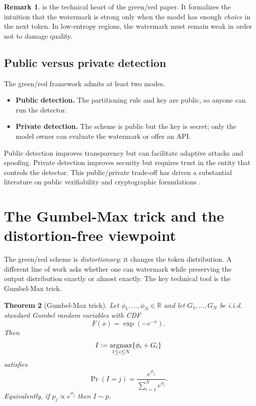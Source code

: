 \documentclass[11pt]{article}
\newtheorem{theorem}{Theorem}[section]
\theoremstyle{definition}
\newtheorem{remark}[theorem]{Remark}
\newcommand{\PrK}{\Pr}
\newcommand{\1}{\mathbf{1}}
\begin{document}
\begin{remark}
 is the technical heart of the green/red paper. It formalizes the intuition that the watermark is strong only when the model has enough \emph{choice} in the next token. In low-entropy regions, the watermark must remain weak in order not to damage quality.
\end{remark}

\subsection{Public versus private detection}

The green/red framework admits at least two modes.

\begin{itemize}
    \item \textbf{Public detection.} The partitioning rule and key are public, so anyone can run the detector.
    \item \textbf{Private detection.} The scheme is public but the key is secret; only the model owner can evaluate the watermark or offer an API.
\end{itemize}

Public detection improves transparency but can facilitate adaptive attacks and spoofing. Private detection improves security but requires trust in the entity that controls the detector. This public/private trade-off has driven a substantial literature on public verifiability and cryptographic formulations \cite{fairoze2024public,liu2024upv,christ2024undetectable}.

\section{The Gumbel-Max trick and the distortion-free viewpoint}

The green/red scheme is \emph{distortionary}: it changes the token distribution. A different line of work asks whether one can watermark while preserving the output distribution exactly or almost exactly. The key technical tool is the Gumbel-Max trick.

\begin{theorem}[Gumbel-Max trick]
Let $\phi_1,\dots,\phi_N\in\mathbb{R}$ and let $G_1,\dots,G_N$ be i.i.d. standard Gumbel random variables with CDF
\[
F(x)=\exp(-e^{-x}).
\]
Then
\[
I := \mathop{\mbox{{\rm argmax}}}\limits_{1\le i\le N} \{\phi_i + G_i\}
\]
satisfies
\[
\PrK(I=j)=\frac{e^{\phi_j}}{\sum_{i=1}^N e^{\phi_i}}.
\]
Equivalently, if $p_j \propto e^{\phi_j}$ then $I\sim p$.
\end{theorem}
\end{document}

